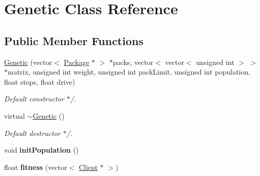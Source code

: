 \hypertarget{classGenetic}{}\section{Genetic Class Reference}
\label{classGenetic}
\subsection*{Public Member Functions}
\begin{DoxyCompactItemize}
\item 
\hyperlink{classGenetic_a459e4673eb23cb59264140f952f67517}{Genetic} (vector$<$ \hyperlink{classPackage}{Package} $\ast$ $>$ $\ast$packs, vector$<$ vector$<$ unsigned int $>$ $>$ $\ast$matrix, unsigned int weight, unsigned int pack\+Limit, unsigned int population, float stops, float drive)\hypertarget{classGenetic_a459e4673eb23cb59264140f952f67517}{}\label{classGenetic_a459e4673eb23cb59264140f952f67517}

\begin{DoxyCompactList}\small\item\em Default constructor $\ast$/. \end{DoxyCompactList}\item 
virtual \hyperlink{classGenetic_a1a441ff7125fb70aeb0ad279474af9a6}{$\sim$\+Genetic} ()\hypertarget{classGenetic_a1a441ff7125fb70aeb0ad279474af9a6}{}\label{classGenetic_a1a441ff7125fb70aeb0ad279474af9a6}

\begin{DoxyCompactList}\small\item\em Default destructor $\ast$/. \end{DoxyCompactList}\item 
void {\bfseries init\+Population} ()\hypertarget{classGenetic_a8fc0ba91c031e9606a63bee4efa15fd9}{}\label{classGenetic_a8fc0ba91c031e9606a63bee4efa15fd9}

\item 
float {\bfseries fitness} (vector$<$ \hyperlink{classClient}{Client} $\ast$ $>$)\hypertarget{classGenetic_a93e3fd37c5ea87fe2d5189387ff813b8}{}\label{classGenetic_a93e3fd37c5ea87fe2d5189387ff813b8}

\end{DoxyCompactItemize}
